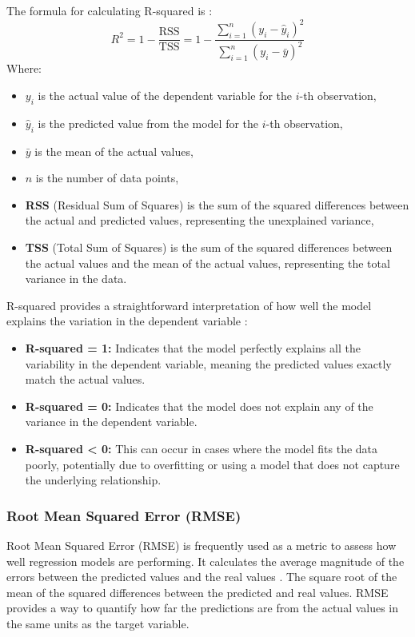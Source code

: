 \documentclass[12pt, a4paper,oneside]{book}
\numberwithin{equation}{section}
\begin{document}
The formula for calculating R-squared is \cite{cohen2002} \cite{bhandari2024}:
\[R^2 = 1 - \frac{\text{RSS}}{\text{TSS}} = 1 - \frac{\sum_{i=1}^{n} (y_i - \hat{y}_i)^2}{\sum_{i=1}^{n} (y_i - \bar{y})^2}\]
Where:
\begin{itemize}
    \item \( y_i \) is the actual value of the dependent variable for the \( i \)-th observation,
    \item \( \hat{y}_i \) is the predicted value from the model for the \( i \)-th observation,
    \item \( \bar{y} \) is the mean of the actual values,
    \item \( n \) is the number of data points,
    \item \textbf{RSS} (Residual Sum of Squares) is the sum of the squared differences between the actual and predicted values, representing the unexplained variance,
    \item \textbf{TSS} (Total Sum of Squares) is the sum of the squared differences between the actual values and the mean of the actual values, representing the total variance in the data.
\end{itemize}
R-squared provides a straightforward interpretation of how well the model explains the variation in the dependent variable \cite{bhandari2024}:
\begin{itemize}
    \item \textbf{R-squared = 1:} Indicates that the model perfectly explains all the variability in the dependent variable, meaning the predicted values exactly match the actual values.
    \item \textbf{R-squared = 0:} Indicates that the model does not explain any of the variance in the dependent variable.
    \item \textbf{R-squared < 0:} This can occur in cases where the model fits the data poorly, potentially due to overfitting or using a model that does not capture the underlying relationship.
\end{itemize}

\subsubsection{Root Mean Squared Error (RMSE)}

Root Mean Squared Error (RMSE) is frequently used as a metric to assess how well regression models are performing. It calculates the average magnitude of the errors between the predicted values and the real values \cite{draper1998} \cite{hastie2009}. The square root of the mean of the squared differences between the predicted and real values. RMSE provides a way to quantify how far the predictions are from the actual values in the same units as the target variable.
\end{document}
